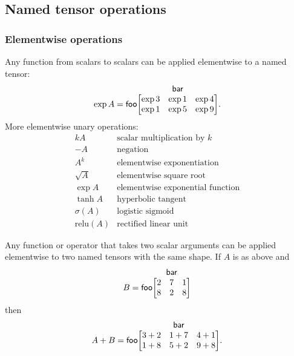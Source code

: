 \documentclass{article}
\makeatletter
\newcommand{\nmatrix}[3]{\name{#1}\begin{array}[b]{@{}c@{}}\name{#2}\\\begin{bmatrix}#3\end{bmatrix}\end{array}}
\makeatother
\begin{document}
\subsection{Named tensor operations}
\label{sec:operations}

\subsubsection{Elementwise operations}
\label{sec:elementwise}

Any function from scalars to scalars can be applied elementwise to a named tensor:
\begin{equation*}
\exp A = \nmatrix{foo}{bar}{
  \exp 3 & \exp 1 & \exp 4 \\
  \exp 1 & \exp 5 & \exp 9
}.
\end{equation*}
More elementwise unary operations:
\[\begin{array}{cl}
kA & \text{scalar multiplication by $k$} \\
-A & \text{negation} \\
A^k & \text{elementwise exponentiation} \\
\sqrt{A} &\text{elementwise square root} \\
\exp A & \text{elementwise exponential function} \\
\tanh A & \text{hyperbolic tangent} \\
\sigma(A) & \text{logistic sigmoid} \\
\text{relu}(A) & \text{rectified linear unit}
\end{array}\]

Any function or operator that takes two scalar arguments can be applied elementwise to two named tensors with the same shape. If $A$ is as above and
\begin{equation*}
B = \nmatrix{foo}{bar}{
  2 & 7 & 1 \\
  8 & 2 & 8
}
\end{equation*}
then
\begin{equation*}
A + B = \nmatrix{foo}{bar}{
  3+2 & 1+7 & 4+1 \\
  1+8 & 5+2 & 9+8
}.
\end{equation*}
\end{document}
